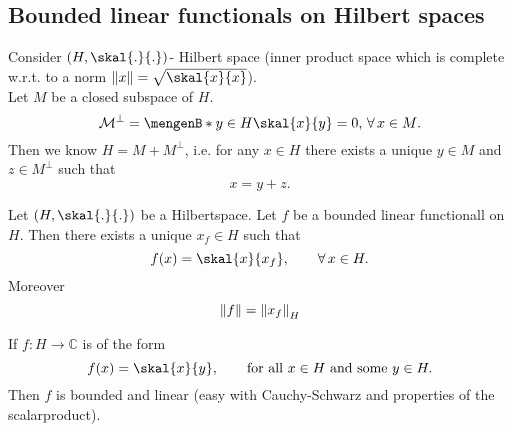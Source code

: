 

\subsection{Bounded linear functionals on Hilbert spaces} 
\label{sub:bounded_linear_functionals_on_hilbert_spaces}

Consider $(H, \skal{.}{.})$- Hilbert space (inner product space which is complete w.r.t. to a norm $\norm{x}= \sqrt{\skal{x}{x}}$). \\
Let $M$ be a closed subspace of $H$. 
\[
	\mathcal{M}^{\perp} = \set[y \in H]{\skal{x}{y}= 0, \, \forall\,  x \in M}.
\]
Then we know $H = M + M^{\perp}$, i.e. for any $x \in H$ there exists a unique $y \in M$ and $z \in M^{\perp}$ such that
\[
	x = y + z.
\]
\begin{theorem}
	Let $(H, \skal{.}{.})$ be a Hilbertspace. Let $f$ be a bounded linear functionall on $H$. Then there exists a unique $x_f \in H$ such that
	\[
		f(x) = \skal{x}{x_f}, \qquad \forall\,  x \in H.
	\]
	Moreover \[
		\norm{f} = \norm{x_f}_H
	\]
\end{theorem}
\begin{bemerkung}
	If $f: H \to \mathbb{C}$ is of the form
	\[
		f(x) = \skal{x}{y}, \qquad \text{for all } x \in H \text{ and some }y \in H.
	\]
	Then $f$ is bounded and linear (easy with Cauchy-Schwarz and properties of the scalarproduct).
\end{bemerkung}
